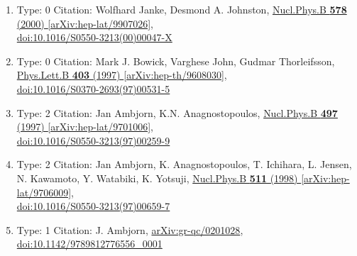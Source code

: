 \documentclass[a4paper,10pt]{article}
\begin{document}
\begin{enumerate}
\begin{enumerate}
  \item Type: 0 Citation: Wolfhard Janke, Desmond A. Johnston, \href{https://www.doi.org/10.1016/S0550-3213(00)00047-X}{Nucl.Phys.B {\bf 578} (2000) }  \href{https://arxiv.org/abs/hep-lat/9907026}{[arXiv:hep-lat/9907026]},\\\href{https://www.doi.org/10.1016/S0550-3213(00)00047-X}{doi:10.1016/S0550-3213(00)00047-X}
  \item Type: 0 Citation: Mark J. Bowick, Varghese John, Gudmar Thorleifsson, \href{https://www.doi.org/10.1016/S0370-2693(97)00531-5}{Phys.Lett.B {\bf 403} (1997) }  \href{https://arxiv.org/abs/hep-th/9608030}{[arXiv:hep-th/9608030]},\\\href{https://www.doi.org/10.1016/S0370-2693(97)00531-5}{doi:10.1016/S0370-2693(97)00531-5}
  \item Type: 2 Citation: Jan Ambjorn, K.N. Anagnostopoulos, \href{https://www.doi.org/10.1016/S0550-3213(97)00259-9}{Nucl.Phys.B {\bf 497} (1997) }  \href{https://arxiv.org/abs/hep-lat/9701006}{[arXiv:hep-lat/9701006]},\\\href{https://www.doi.org/10.1016/S0550-3213(97)00259-9}{doi:10.1016/S0550-3213(97)00259-9}
  \item Type: 2 Citation: Jan Ambjorn, K. Anagnostopoulos, T. Ichihara, L. Jensen, N. Kawamoto, Y. Watabiki, K. Yotsuji, \href{https://www.doi.org/10.1016/S0550-3213(97)00659-7}{Nucl.Phys.B {\bf 511} (1998) }  \href{https://arxiv.org/abs/hep-lat/9706009}{[arXiv:hep-lat/9706009]},\\\href{https://www.doi.org/10.1016/S0550-3213(97)00659-7}{doi:10.1016/S0550-3213(97)00659-7}
  \item Type: 1 Citation: J. Ambjorn, \href{https://arxiv.org/abs/gr-qc/0201028}{arXiv:gr-qc/0201028},\\\href{https://www.doi.org/10.1142/9789812776556_0001}{doi:10.1142/9789812776556\_0001}

\end{enumerate}
\end{enumerate}
\end{document}

